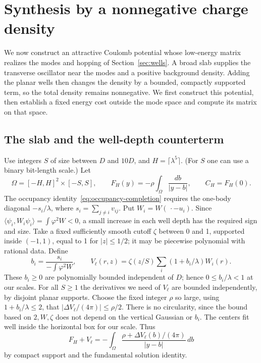 \section{Synthesis by a nonnegative charge density}\label{sec:density}

We now construct an attractive Coulomb potential whose low-energy
matrix realizes the modes and hopping of Section~\ref{sec:wells}.
A broad slab supplies the transverse oscillator near the modes and a
positive background density. Adding the planar wells then changes the
density by a bounded, compactly supported term, so the total density
remains nonnegative. We first construct this potential, then establish
a fixed energy cost outside the mode space and compute its matrix on
that space.

\subsection{The slab and the well-depth counterterm}

Use integers \(S\) of size between \(D\) and \(10D\), and \(H=\lceil\lambda^5\rceil\). (For \(S\) one can use a binary bit-length scale.) Let
\[
 \Omega=[-H,H]^2\times[-S,S],\qquad
 F_H(y)=-\rho\int_\Omega\frac{db}{|y-b|},\qquad C_H=F_H(0).
\]
The occupancy identity~\eqref{eq:occupancy-completion} requires the
one-body diagonal \(-s_i/\lambda\), where
\(s_i=\sum_{j\ne i}v_{ij}\). Put \(W_i=W(\,\cdot-u_i)\).
Since \(\langle\psi_i,W_i\psi_i\rangle=\int\varphi^2W<0\),
a small increase in each well depth has the required sign and size.
Take a fixed sufficiently smooth cutoff \(\zeta\) between 0 and 1,
supported inside \((-1,1)\), equal to 1 for \(|z|\le 1/2\);
it may be piecewise polynomial with rational data. Define
\[
 b_i=\frac{s_i}{-\int\varphi^2 W},\qquad
 V_\ell(r,z)=\zeta(z/S)\sum_i(1+b_i/\lambda)W_i(r).
\]
These \(b_i\ge0\) are polynomially bounded independent of \(D\); hence \(0\le b_i/\lambda<1\) at our scales. For all \(S\ge1\) the derivatives we need of \(V_\ell\) are bounded independently, by disjoint planar supports. Choose the fixed integer \(\rho\) so large, using \(1+b_i/\lambda\le2\), that \(|\Delta V_\ell/(4\pi)|\le\rho/2\). There is no circularity, since the bound based on \(2,W,\zeta\) does not depend on the vertical Gaussian or \(b_i\). The centers fit well inside the horizontal box for our scale. Thus
\[
               F_H+V_\ell
   =-\int_\Omega \frac{\rho+\Delta V_\ell(b)/(4\pi)}{|y-b|}\,db       \tag{4}\label{eq:4}
\]
by compact support and the fundamental solution identity.

